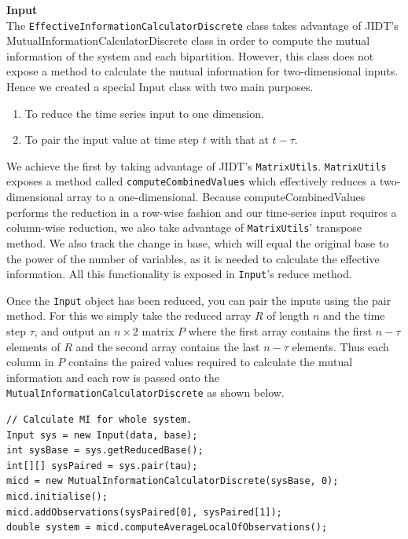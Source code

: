 \documentclass[a4paper,11pt]{article}
\begin{document}
\noindent \textbf{Input}\\

\noindent The \texttt{EffectiveInformationCalculatorDiscrete} class takes advantage of JIDT's MutualInformationCalculatorDiscrete class in order to compute the mutual information of the system and each bipartition. However, this class does not expose a method to calculate the mutual information for two-dimensional inputs. Hence we created a special Input class with two main purposes.

\begin{enumerate}
\item{To reduce the time series input to one dimension.}
\item{To pair the input value at time step $t$ with that at $t-\tau$.}
\end{enumerate}

We achieve the first by taking advantage of JIDT's \texttt{MatrixUtils}. \texttt{MatrixUtils} exposes a method called \texttt{computeCombinedValues} which effectively reduces a two-dimensional array to a one-dimensional. Because computeCombinedValues performs the reduction in a row-wise fashion and our time-series input requires a column-wise reduction, we also take advantage of \texttt{MatrixUtils}' transpose method. We also track the change in base, which will equal the original base to the power of the number of variables, as it is needed to calculate the effective information. All this functionality is exposed in \texttt{Input}'s reduce method.

Once the \texttt{Input} object has been reduced, you can pair the inputs using the pair method. For this we simply take the reduced array $R$ of length $n$ and the time step $\tau$, and output an $n \times 2$ matrix $P$ where the first array contains the first $n - \tau$ elements of $R$ and the second array contains the last $n - \tau$ elements. Thus each column in $P$ contains the paired values required to calculate the mutual information and each row is passed onto the \texttt{MutualInformationCalculatorDiscrete} as shown below.

\begin{verbatim}
// Calculate MI for whole system.
Input sys = new Input(data, base);
int sysBase = sys.getReducedBase();
int[][] sysPaired = sys.pair(tau);
micd = new MutualInformationCalculatorDiscrete(sysBase, 0);
micd.initialise();
micd.addObservations(sysPaired[0], sysPaired[1]);
double system = micd.computeAverageLocalOfObservations();
\end{verbatim}
\end{document}
